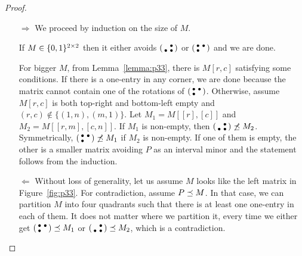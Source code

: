 \begin{proof}
\begin{itemize}
	\item[$\Rightarrow$] We proceed by induction on the size of $M$.

If $M\in\{0,1\}^{2\times2}$ then it either avoids $\left(\begin{smallmatrix} &\bullet\\\bullet&\bullet\end{smallmatrix}\right)$ or $\left(\begin{smallmatrix}\bullet&\bullet\\\bullet& \end{smallmatrix}\right)$ and we are done.

For bigger $M$, from Lemma~\ref{lemma:p33}, there is $M[r,c]$ satisfying some conditions. If there is a one-entry in any corner, we are done because the matrix cannot contain one of the rotations of $\left(\begin{smallmatrix}\bullet&\bullet\\\bullet& \end{smallmatrix}\right)$. Otherwise, assume $M[r,c]$ is both top-right and bottom-left empty and $(r,c)\not\in\{(1,n),(m,1)\}$. Let $M_1=M[[r],[c]]$ and $M_2=M[[r,m],[c,n]]$. If $M_1$ is non-empty, then $\left(\begin{smallmatrix} &\bullet\\\bullet&\bullet\end{smallmatrix}\right)\not\preceq M_2$. Symmetrically, $\left(\begin{smallmatrix}\bullet&\bullet\\\bullet& \end{smallmatrix}\right)\not\preceq M_1$ if $M_2$ is non-empty. If one of them is empty, the other is a smaller matrix avoiding $P$ as an interval minor and the statement follows from the induction.
	\item[$\Leftarrow$] Without loss of generality, let us assume $M$ looks like the left matrix in Figure~\ref{fig:p33}. For contradiction, assume $P\preceq M$. In that case, we can partition $M$ into four quadrants such that there is at least one one-entry in each of them. It does not matter where we partition it, every time we either get $\left(\begin{smallmatrix}\bullet&\bullet\\\bullet& \end{smallmatrix}\right)\preceq M_1$ or $\left(\begin{smallmatrix} &\bullet\\\bullet&\bullet\end{smallmatrix}\right)\preceq M_2$, which is a contradiction.
\end{itemize}
\end{proof}

